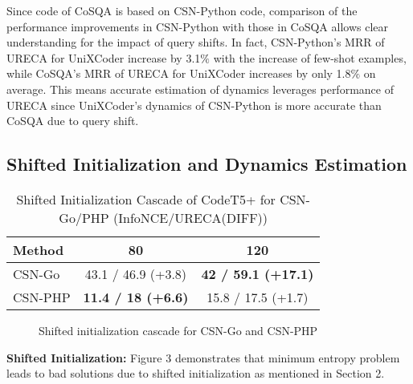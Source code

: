 Since code of CoSQA is based on CSN-Python code, comparison of the performance improvements in CSN-Python with those in CoSQA allows 
clear understanding for the impact of query shifts. 
In fact, CSN-Python's MRR of URECA for UniXCoder increase by 3.1$\%$ with the increase of few-shot examples,
while  CoSQA's MRR of URECA for UniXCoder increases by only 1.8$\%$ on average. 
This means accurate estimation of dynamics leverages performance of URECA 
since UniXCoder's dynamics of CSN-Python is more accurate than CoSQA due to query shift.

\subsection{Shifted Initialization and Dynamics Estimation}
\begin{table}[h]
\centering
\def\arraystretch{0.8}
\setlength\tabcolsep{6pt} %
\begin{tabular}{@{}lcc@{}}

\toprule
\multicolumn{1}{l}{Method}                      
& \multicolumn{1}{c}{80}          & \multicolumn{1}{c}{120}                \\ \midrule

     
CSN-Go                      & \multicolumn{1}{c}{43.1 / 46.9 (+3.8)}          
                            & \multicolumn{1}{c}{\textbf{42 / 59.1 (+17.1)}}                          
                            \\ \midrule 
CSN-PHP                     & \multicolumn{1}{c}{\textbf{11.4 / 18 (+6.6)}}          
                            & \multicolumn{1}{c}{15.8 / 17.5 (+1.7)}                             
                            \\ \bottomrule 
\end{tabular}
\caption{Shifted Initialization Cascade of CodeT5+ for CSN-Go/PHP (InfoNCE/URECA(DIFF))}
\label{Shifted Initialization CasCade Performance}
\end{table}
\begin{figure}[h]
\centering
{}
\centering
\caption{
Shifted initialization cascade for CSN-Go and CSN-PHP
}
\end{figure}
\textbf{Shifted Initialization: } 
Figure 3 demonstrates that minimum entropy problem leads to bad solutions due to shifted initialization as mentioned in Section 2.
